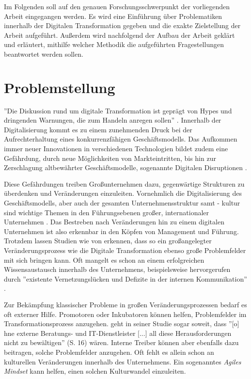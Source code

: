 Im Folgenden soll auf den genauen Forschungsschwerpunkt der vorliegenden Arbeit eingegangen werden. Es wird eine Einführung über Problematiken innerhalb der Digitalen Transformation gegeben und die exakte Zielstellung der Arbeit aufgeführt. Außerdem wird nachfolgend der Aufbau der Arbeit geklärt und erläutert, mithilfe welcher Methodik die aufgeführten Fragestellungen beantwortet werden sollen.

\section{Problemstellung}

''Die Diskussion rund um digitale Transformation ist geprägt von Hypes und dringenden Warnungen, die zum Handeln anregen sollen'' \cite[S. 12]{berghaus_2016}. Innerhalb der Digitalisierung kommt es zu einem zunehmenden Druck bei der Aufrechterhaltung eines konkurrenzfähigen Geschäftsmodells. Das Aufkommen immer neuer Innovationen in verschiedenen Technologien bildet zudem eine Gefährdung, durch neue Möglichkeiten von Markteintritten, bis hin zur Zerschlagung altbewährter Geschäftsmodelle, sogenannte Digitalen Disruptionen \cite{urbach_digitalization_2018}.

Diese Gefährdungen treiben Großunternehmen dazu, gegenwärtige Strukturen zu überdenken und Veränderungen einzuleiten. Vornehmlich die Digitalisierung des Geschäftsmodells, aber auch der gesamten Unternehmensstruktur samt - kultur sind wichtige Themen in den Führungsebenen großer, internationaler Unternehmen \cite[S. 18]{buhse_transformationswerk_2016}. Das Bestreben nach Veränderungen hin zu einem digitalen Unternehmen ist also erkennbar in den Köpfen von Management und Führung. Trotzdem lassen Studien wie von  erkennen, dass so ein großangelegter Veränderungsprozess wie die Digitale Transformation ebenso große Problemfelder mit sich bringen kann. Oft mangelt es schon an einem erfolgreichen Wissensaustausch innerhalb des Unternehmens, beispielsweise hervorgerufen durch ''existente Vernetzungslücken und Defizite in der internen Kommunikation'' \cite[S. 18]{buhse_transformationswerk_2016}.

Zur Bekämpfung klassischer Probleme in großen Veränderungsprozessen bedarf es oft externer Hilfe. Promotoren oder Inkubatoren können helfen, Problemfelder im Transformationsprozess anzugehen.  geht in seiner Studie sogar soweit, dass ''$\lbrack$o$\rbrack$hne externe Beratungs- und IT-Dienstleister $\lbrack$...$\rbrack$ all diese Herausforderungen nicht zu bewältigen'' (S. 16) wären. Interne Treiber können aber ebenfalls dazu beitragen, solche Problemfelder anzugehen. Oft fehlt es allein schon an kulturellen Veränderungen innerhalb des Unternehmens. Ein sogenanntes \textit{Agiles Mindset} kann helfen, einen  solchen Kulturwandel einzuleiten. \cite{hofert_agile_2018}

